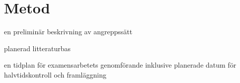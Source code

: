 \chapter{Metod}\label{cha:metod}

en preliminär beskrivning av angreppssätt

planerad litteraturbas

en tidplan för examensarbetets genomförande inklusive planerade datum för halvtidskontroll och framläggning
